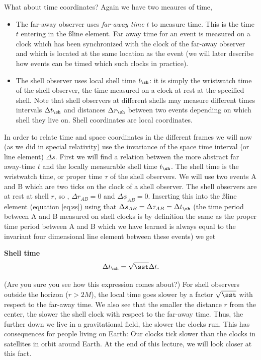 {\begin{multicols}{2}
What about time coordinates? Again we have two meaures of time,
\begin{itemize}
\item The far-away observer uses {\it far-away time} $t$ to measure time. This is the time $t$ entering in the \ss line element. Far away time for an event is measured on a clock which has been synchronized with the clock of the far-away observer and which is located at the same location as the event (we will later describe how events can be timed which such clocks in practice).

\item The shell observer uses local shell time $t_\sh$: it is simply the wristwatch time of the shell observer, the time measured on a clock at rest at the specified shell. Note that shell observers at different shells may measure different times intervals $\Delta t_\sh$ and distances $\Delta r_\sh$ between two events depending on which shell they live on. Shell coordinates are local coordinates. 
\end{itemize}

In order to relate time and space coordinates in the different frames we will now (as we did in special relativity) use the invariance of the space time interval (or line element) $\Delta s$. First we will find a relation between the more abstract far away-time $t$ and the locally measurable shell time $t_\sh$. The shell time is the wristwatch time, or proper time $\tau$ of the shell observers. We will use two events A and B which are two ticks on the clock of a shell observer. The shell observers are at rest at shell $r$, so , $\Delta r_{AB}=0$ and $\Delta \phi_{AB}=0$. Inserting this into the \ss line element (equation \ref{eq:ss}) using that $\Delta s_{AB}=\Delta\tau_{AB}=\Delta t_\sh$ (the time period between A and B measured on shell clocks is by definition the same as the proper time period between A and B which we have learned is always equal to the invariant four dimensional line element between these events) we get
\begin{formbox}
\textbf{Shell time}
\begin{equation}
\label{eq:tt}
\Delta t_\sh=\sqrt{\sst} \Delta t.
\end{equation}
\end{formbox}
(Are you sure you see how this expression comes about?) For shell observers outside the horizon ($r>2M$), the local time goes slower by a factor $\sqrt{\sst}$ with respect to the far-away time. We also see that the smaller the distance $r$ from the center, the slower the shell clock with respect to the far-away time. Thus, the further down we live in a gravitational field, the slower the clocks run. This has consequences for people living on Earth: Our clocks tick slower than the clocks in satellites in orbit around Earth. At the end of this lecture, we will look closer at this fact.


\end{multicols}}
